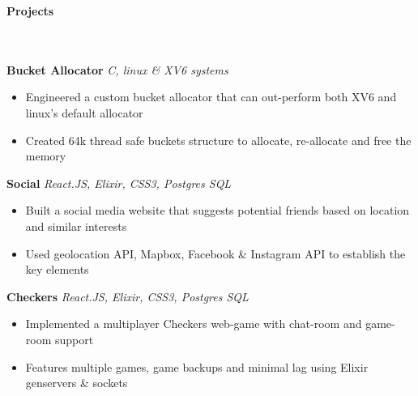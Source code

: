 \documentclass[]{article}
\newcommand{\lineunder} {
    \vspace*{-8pt} \\
    \hrulefill \\
}
\newcommand{\header} [1] {
    {\vspace*{6pt} \fontsize{12}{12}\selectfont \textbf{#1}}
     \lineunder
}
\begin{document}
\vspace{-3mm}
\header{Projects}
\vspace{1mm}
{\hspace{2mm}\textbf{Bucket Allocator}} {\sl C, linux \& XV6 systems} \\
\vspace{-3mm}
\begin{itemize}
        \setlength\itemsep{-1mm}
        \item Engineered a custom bucket allocator that can out-perform both XV6 and linux's default allocator
        \item Created 64k thread safe buckets structure to allocate, re-allocate and free the memory
\end{itemize}

\vspace{-2mm}
{\hspace{2mm}\textbf{Social}} {\sl React.JS, Elixir, CSS3, Postgres SQL} \\
\vspace{-3mm}
\begin{itemize}
        \setlength\itemsep{-1mm}
        \item Built a social media website that suggests potential friends based on location and
        similar interests
        \item Used geolocation API, Mapbox, Facebook \& Instagram API to establish the key elements
\end{itemize}
\vspace{-2mm}
{\hspace{2mm}\textbf{Checkers}} {\sl React.JS, Elixir, CSS3, Postgres SQL} \\
\vspace{-3mm}
\begin{itemize}
        \setlength\itemsep{-1mm}
        \item Implemented a multiplayer Checkers web-game with chat-room and game-room support
        \item Features multiple games, game backups and minimal lag using Elixir genservers \& sockets
\end{itemize}
\end{document}
